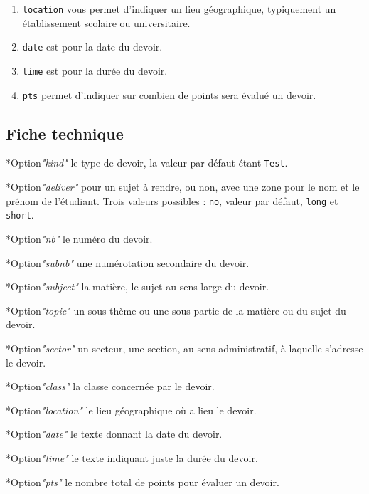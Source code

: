 \documentclass[12pt,a4paper]{scrartcl}
\makeatletter
\theoremstyle{definition}
\newcommand\IDmacro{\@ifstar{\@IDmacroStar}{\@IDmacroNoStar}}
\newcommand\@IDmacroNoStar[3]{%
    \texttt{%
    	\textbackslash#1%
    	\IfStrEq{#2}{0}{}{%
    		\,\,[#2 Option%
			\IfStrEq{#2}{1}{}{s}]%
		}%
	    \IfStrEq{#3}{}{}{%
    		\,\,(#3 Argument%
			\IfStrEq{#3}{1}{}{s})%
		}
   	}
    \immediate\write\tempfile{macro@#1@#2@#3}%
}
\newcommand\@IDmacroStar[2]{%
    \@IDmacroNoStar{#1}{0}{#2}%
}
\newcommand\@IDoptarg{\@ifstar{\@IDoptargStar}{\@IDoptargNoStar}}
\newcommand\@IDoptargStar[2]{%
	\vspace{0.5em}
	--- \texttt{#1%
		\IfStrEq{#2}{}{:}{\,#2:}%
	}%
}
\newcommand\@IDoptargNoStar[2]{%
	\IfStrEq{#2}{}{%
		\@IDoptargStar{#1}{}%
	}{%
		\@IDoptargStar{#1}{\##2}%
	}%
}
\newcommand\IDkey[1]{%
	\@IDoptarg*{Option}{{\itshape "#1"}}%
}
\makeatother
\begin{document}
\begin{enumerate}
    \item \verb+location+ vous permet d'indiquer un lieu géographique, typiquement un établissement scolaire ou universitaire.

    \item \verb+date+ est pour la date du devoir.

    \item \verb+time+ est pour la durée du devoir.

    \item \verb+pts+ permet d'indiquer sur combien de points sera évalué un devoir.
\end{enumerate}


    \subsection{Fiche technique}

\IDmacro{exam}{12}{}

\IDkey{kind} le type de devoir, la valeur par défaut étant \verb+Test+.

\IDkey{deliver} pour un sujet à rendre, ou non, avec une zone pour le nom et le prénom de l'étudiant. Trois valeurs possibles : \verb+no+, valeur par défaut, \verb+long+ et \verb+short+.

\IDkey{nb} le numéro du devoir.

\IDkey{subnb} une numérotation secondaire du devoir.

\IDkey{subject} la matière, le sujet au sens large du devoir.

\IDkey{topic} un sous-thème ou une sous-partie de la matière ou du sujet du devoir.

\IDkey{sector} un secteur, une section, au sens administratif, à laquelle s'adresse le devoir.

\IDkey{class} la classe concernée par le devoir.

\IDkey{location} le lieu géographique où a lieu le devoir.

\IDkey{date} le texte donnant la date du devoir.

\IDkey{time} le texte indiquant juste la durée du devoir.

\IDkey{pts} le nombre total de points pour évaluer un devoir.




\newcommand\exosoptionsdescription{
Toutes les options données ci-dessous sont facultatives. Attention car avec les versions simplement étoilées il faut utiliser \texttt{id},
tandis qu'avec les versions doublement étoilées on doit se servir de l'option \texttt{title}.
}
\end{document}
